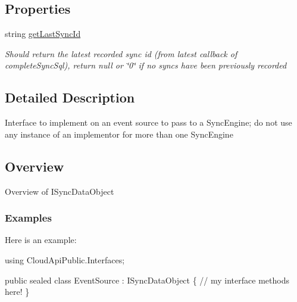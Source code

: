 \subsection*{Properties}
\begin{DoxyCompactItemize}
\item 
string \hyperlink{interface_cloud_api_public_1_1_interfaces_1_1_i_sync_data_object_a1e0e4f15f93fce38eb008953eb1dd477}{get\-Last\-Sync\-Id}
\begin{DoxyCompactList}\small\item\em Should return the latest recorded sync id (from latest callback of complete\-Sync\-Sql), return null or \char`\"{}0\char`\"{} if no syncs have been previously recorded \end{DoxyCompactList}\end{DoxyCompactItemize}


\subsection{Detailed Description}
Interface to implement on an event source to pass to a Sync\-Engine; do not use any instance of an implementor for more than one Sync\-Engine 

\hypertarget{interface_cloud_api_public_1_1_interfaces_1_1_i_sync_data_object_sec}{}\subsection{Overview}\label{interface_cloud_api_public_1_1_interfaces_1_1_i_sync_data_object_sec}
\begin{DoxyVerb}  Overview of ISyncDataObject
\end{DoxyVerb}
\hypertarget{interface_cloud_api_public_1_1_interfaces_1_1_i_sync_data_object_subSec1}{}\subsubsection{Examples}\label{interface_cloud_api_public_1_1_interfaces_1_1_i_sync_data_object_subSec1}
\begin{DoxyVerb}  Here is an example:
\end{DoxyVerb}



\begin{DoxyCode}
\textcolor{keyword}{using} CloudApiPublic.Interfaces;

\textcolor{keyword}{public} sealed \textcolor{keyword}{class }EventSource : ISyncDataObject
\{
    \textcolor{comment}{// my interface methods here!}
\}
\end{DoxyCode}
 

